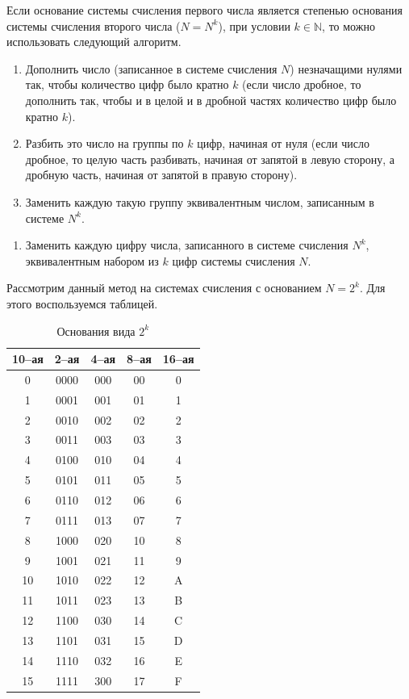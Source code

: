 Если основание системы счисления первого числа является степенью основания системы счисления второго числа ($N = N^{k}$), при условии $k \in \mathbb{N}$, то можно использовать следующий алгоритм.
\begin{center}
\end{center}

\begin{enumerate}
\item Дополнить число (записанное в системе счисления $N$) незначащими нулями так, чтобы количество цифр было кратно $k$ (если число дробное, то дополнить так, чтобы и в целой и в дробной частях количество цифр было кратно $k$).
\item Разбить это число на группы по $k$ цифр, начиная от нуля (если число дробное, то целую часть разбивать, начиная от запятой в левую сторону, а дробную часть, начиная от запятой в правую сторону).
\item Заменить каждую такую группу эквивалентным числом, записанным в системе $N^{k}$.
\end{enumerate}

\begin{center}
\end{center}

\begin{enumerate}
\item Заменить каждую цифру числа, записанного в системе счисления $N^{k}$, эквивалентным набором из $k$ цифр системы счисления $N$.
\end{enumerate}

Рассмотрим данный метод на системах счисления с основанием $N = 2^{k}$. Для этого воспользуемся таблицей.
\begin{table}[h!]
\caption{Основания вида $2^{k}$}
\centering
\begin{tabular}{|c|c|c|c|c|}
\hline
10--ая & 2--ая & 4--ая & 8--ая & 16--ая
\\\hline
0 & 0000 & 000 & 00 & 0
\\ 1 & 0001& 001 & 01 & 1
\\ 2 & 0010 & 002 & 02 & 2
\\ 3 & 0011 &003 & 03 & 3
\\ 4 & 0100 & 010 & 04 & 4
\\ 5 & 0101 & 011 & 05 & 5
\\ 6 & 0110 & 012 & 06 & 6
\\ 7 & 0111 & 013 & 07 & 7
\\ 8 & 1000 & 020 & 10 & 8
\\ 9 & 1001 & 021 & 11 & 9
\\ 10 & 1010 & 022 & 12 & A
\\ 11 & 1011 & 023 & 13 & B
\\ 12 & 1100 & 030 & 14 & C
\\ 13 & 1101 & 031 & 15 & D
\\ 14 & 1110 & 032 & 16 & E
\\ 15 & 1111 &300 & 17 & F
\\\hline
\end{tabular}
\end{table}

